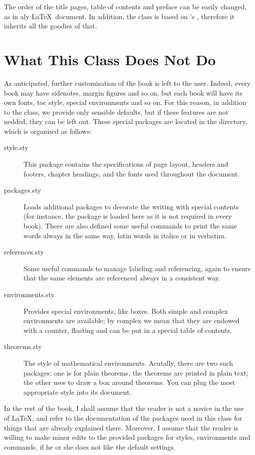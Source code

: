 The order of the title pages, table of contents and preface can be 
easily changed, as in aly \LaTeX\ document. In addition, the class is 
based on \KOMAScript's , therefore it inherits all the 
goodies of that.

\section{What This Class Does Not Do}

As anticipated, further customisation of the book is left to the user. 
Indeed, every book may have sidenotes, margin figures and so on, but 
each book will have its own fonts, toc style, special environments and 
so on. For this reason, in addition to the class, we provide only 
sensible defaults, but if these features are not nedded, they can be 
left out. These special packages are located in the  
directory, which is organised as follows:

\begin{description}
	\item[style.sty] This package contains the specifications of page 
	layout, headers and footers, chapter headings, and the fonts used 
	throughout the document.
	\item[packages.sty] Loads additional packages to decorate the 
	writing with special contents (for instance, the  
	package is loaded here as it is not required in every book). There 
	are also defined some useful commands to print the same words always 
	in the same way, \eg latin words in italics or  in 
	verbatim.
	\item[references.sty] Some useful commands to manage labeling and 
	referencing, again to ensure that the same elements are referenced 
	always in a consistent way.
	\item[environments.sty] Provides special environments, like boxes. 
	Both simple and complex environments are available; by complex we 
	mean that they are endowed with a counter, floating and can be put 
	in a special table of contents.
	\item[theorems.sty] The style of mathematical environments. 
	Acutally, there are two such packages: one is for plain theorems, 
	\ie the theorems are printed in plain text; the other uses 
	 to draw a box around theorems. You can plug the 
	most appropriate style into its document.
\end{description}


In the rest of the book, I shall assume that the reader is not a novice 
in the use of \LaTeX, and refer to the documentation of the packages 
used in this class for things that are already explained there. 
Moreover, I assume that the reader is willing to make minor edits to the 
provided packages for styles, environments and commands, if he or she 
does not like the default settings.
